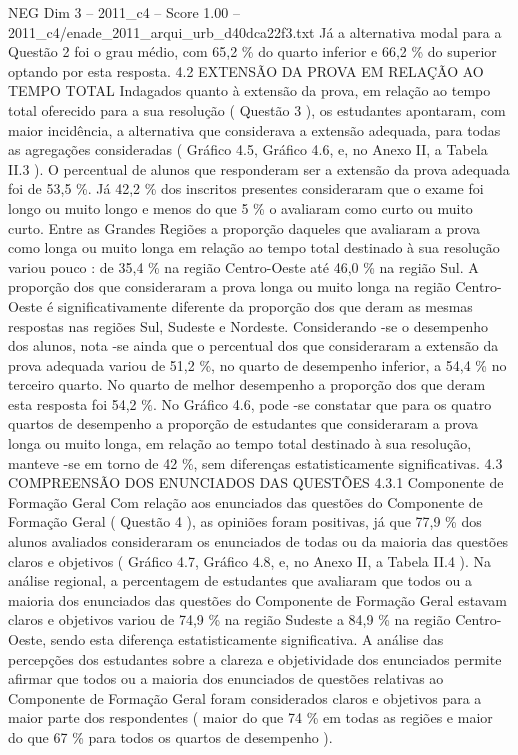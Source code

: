 \begin{textsample}{NEG Dim 3 – 2011\_c4 – Score 1.00 – 2011\_c4/enade\_2011\_arqui\_urb\_d40dca22f3.txt}
Já a alternativa modal para a Questão 2 foi o grau médio, com 65,2 \% do quarto inferior e 66,2 \% do superior optando por esta resposta. 4.2 EXTENSÃO DA PROVA EM RELAÇÃO AO TEMPO TOTAL Indagados quanto à extensão da prova, em relação ao tempo total oferecido para a sua resolução ( Questão 3 ), os estudantes apontaram, com maior incidência, a alternativa que considerava a extensão adequada, para todas as agregações consideradas ( Gráfico 4.5, Gráfico 4.6, e, no Anexo II, a Tabela II.3 ).
O percentual de alunos que responderam ser a extensão da prova adequada foi de 53,5 \%.
Já 42,2 \% dos inscritos presentes consideraram que o exame foi longo ou muito longo e menos do que 5 \% o avaliaram como curto ou muito curto.
Entre as Grandes Regiões a proporção daqueles que avaliaram a prova como longa ou muito longa em relação ao tempo total destinado à sua resolução variou pouco : de 35,4 \% na região Centro-Oeste até 46,0 \% na região Sul.
A proporção dos que consideraram a prova longa ou muito longa na região Centro-Oeste é significativamente diferente da proporção dos que deram as mesmas respostas nas regiões Sul, Sudeste e Nordeste.
Considerando -se o desempenho dos alunos, nota -se ainda que o percentual dos que consideraram a extensão da prova adequada variou de 51,2 \%, no quarto de desempenho inferior, a 54,4 \% no terceiro quarto.
No quarto de melhor desempenho a proporção dos que deram esta resposta foi 54,2 \%.
No Gráfico 4.6, pode -se constatar que para os quatro quartos de desempenho a proporção de estudantes que consideraram a prova longa ou muito longa, em relação ao tempo total destinado à sua resolução, manteve -se em torno de 42 \%, sem diferenças estatisticamente significativas. 4.3 COMPREENSÃO DOS ENUNCIADOS DAS QUESTÕES 4.3.1 Componente de Formação Geral Com relação aos enunciados das questões do Componente de Formação Geral ( Questão 4 ), as opiniões foram positivas, já que 77,9 \% dos alunos avaliados consideraram os enunciados de todas ou da maioria das questões claros e objetivos ( Gráfico 4.7, Gráfico 4.8, e, no Anexo II, a Tabela II.4 ).
Na análise regional, a percentagem de estudantes que avaliaram que todos ou a maioria dos enunciados das questões do Componente de Formação Geral estavam claros e objetivos variou de 74,9 \% na região Sudeste a 84,9 \% na região Centro-Oeste, sendo esta diferença estatisticamente significativa.
A análise das percepções dos estudantes sobre a clareza e objetividade dos enunciados permite afirmar que todos ou a maioria dos enunciados de questões relativas ao Componente de Formação Geral foram considerados claros e objetivos para a maior parte dos respondentes ( maior do que 74 \% em todas as regiões e maior do que 67 \% para todos os quartos de desempenho ).

\end{textsample}
